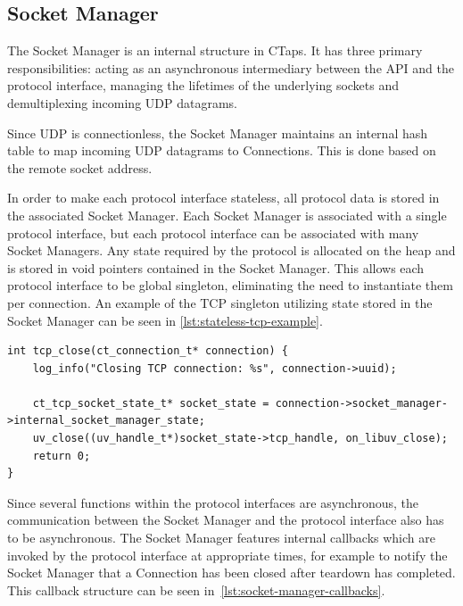 \subsection{Socket Manager} \label{sec:socket-manager-design}
The Socket Manager is an internal structure in CTaps.
It has three primary responsibilities:
acting as an asynchronous intermediary between the API and the
protocol interface, managing the lifetimes of the underlying sockets
and demultiplexing incoming UDP datagrams.

Since UDP is connectionless, the Socket
Manager maintains an internal hash table to map
incoming UDP datagrams to Connections.
This is done based on the remote socket address.

In order to make each protocol interface stateless,
all protocol data is stored in the associated Socket Manager. Each Socket
Manager is associated with a single protocol interface, but
each protocol interface can be associated with many Socket Managers.
Any state required by the protocol is allocated on the heap and is
stored in void pointers contained in the Socket Manager.
This allows each protocol interface to be global singleton,
eliminating the need to instantiate them per connection.
An example of the TCP singleton utilizing state stored in the Socket Manager
can be seen in \cref{lst:stateless-tcp-example}.

\begin{listing}[htbp]
\begin{verbatim}
int tcp_close(ct_connection_t* connection) {
    log_info("Closing TCP connection: %s", connection->uuid);

    ct_tcp_socket_state_t* socket_state = connection->socket_manager->internal_socket_manager_state;
    uv_close((uv_handle_t*)socket_state->tcp_handle, on_libuv_close);
    return 0;
}
\end{verbatim}
\caption[TCP close implementation]{
Example of the TCP interface accessing Socket Manager state when closing a Connection.
}
\label{lst:stateless-tcp-example}
\end{listing}

Since several functions within the protocol interfaces
are asynchronous, the communication between the Socket Manager and the protocol interface also has to be asynchronous.
The Socket Manager features internal
callbacks which are invoked by the protocol
interface at appropriate times, for example to notify
the Socket Manager that a Connection has been closed after teardown
has completed. This callback structure can be seen in~\cref{lst:socket-manager-callbacks}.


